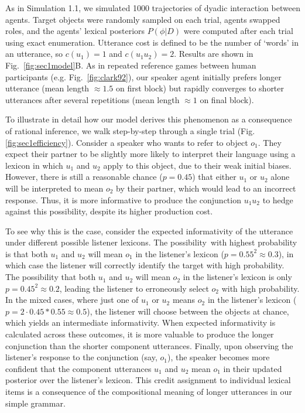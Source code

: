 As in Simulation 1.1, we simulated 1000 trajectories of dyadic interaction between agents.
Target objects were randomly sampled on each trial, agents swapped roles, and the agents' lexical posteriors $P(\phi | D)$ were computed after each trial using exact enumeration. 
Utterance cost is defined to be the number of `words' in an utterance, so $c(u_1) =1$ and $c(u_1u_2)=2$.
Results are shown in Fig.~\ref{fig:sec1model}B.
As in repeated reference games between human participants (e.g. Fig.~\ref{fig:clark92}), our speaker agent initially prefers longer utterance (mean length $\approx 1.5$ on first block) but rapidly converges to shorter utterances after several repetitions (mean length $\approx 1$ on final block).

To illustrate in detail how our model derives this phenomenon as a consequence of rational inference, we walk step-by-step through a single trial (Fig. \ref{fig:sec1efficiency}).
Consider a speaker who wants to refer to object $o_1$. 
They expect their partner to be slightly more likely to interpret their language using a lexicon in which $u_{1}$ and $u_{2}$ apply to this object, due to their weak initial biases. 
However, there is still a reasonable chance ($p=0.45$) that either $u_1$ or $u_2$ alone will be interpreted to mean $o_2$ by their partner, which would lead to an incorrect response. 
Thus, it is more informative to produce the conjunction $u_{1}u_{2}$ to hedge against this possibility, despite its higher production cost. 

To see why this is the case, consider the expected informativity of the utterance under different possible listener lexicons.
The possibility with highest probability is that both $u_1$ and $u_2$ will mean $o_1$ in the listener's lexicon ($p = 0.55^2 \approx 0.3$), in which case the listener will correctly identify the target with high probability.
The possibility that both $u_1$ and $u_2$ will mean $o_2$ in the listener's lexicon is only $p=0.45^2 \approx 0.2$, leading the listener to erroneously select $o_2$ with high probability. 
In the mixed cases, where just one of $u_1$ or $u_2$ means $o_2$ in the listener's lexicon ($p = 2 \cdot 0.45 * 0.55 \approx 0.5$), the listener will choose between the objects at chance, which yields an intermediate informativity.
When expected informativity is calculated across these outcomes, it is more valuable to produce the longer conjunction than the shorter component utterances.
Finally, upon observing the listener's response to the conjunction (say, $o_1$), the speaker becomes more confident that the component utterances $u_1$ and $u_2$ mean $o_1$ in their updated posterior over the listener's lexicon.
This credit assignment to individual lexical items is a consequence of the compositional meaning of longer utterances in our simple grammar.

